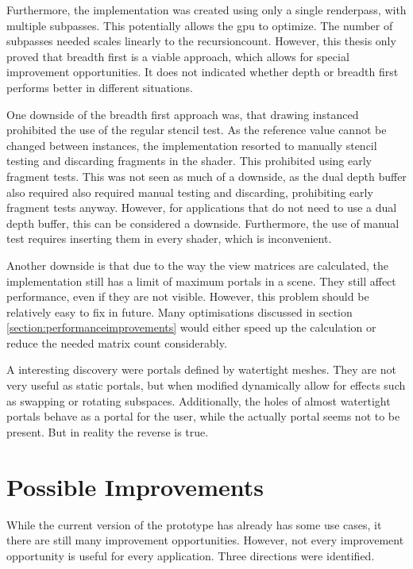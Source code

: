 Furthermore, the implementation was created using only a single renderpass, with multiple subpasses. This potentially allows the \gls{gpu} to optimize. The number of subpasses needed scales linearly to the \gls{recursioncount}. However, this thesis only proved that breadth first is a viable approach, which allows for special improvement opportunities. It does not indicated whether depth or breadth first performs better in different situations.

One downside of the breadth first approach was, that drawing instanced prohibited the use of the regular stencil test. As the reference value cannot be changed between instances, the implementation resorted to manually stencil testing and discarding fragments in the shader. This prohibited using early fragment tests. This was not seen as much of a downside, as the dual depth buffer also required also required manual testing and discarding, prohibiting early fragment tests anyway. However, for applications that do not need to use a dual depth buffer, this can be considered a downside. Furthermore, the use of manual test requires inserting them in every shader, which is inconvenient.

Another downside is that due to the way the view matrices are calculated, the implementation still has a limit of maximum portals in a scene. They still affect performance, even if they are not visible. However, this problem should be relatively easy to fix in future. Many optimisations discussed in section \ref{section:performanceimprovements} would either speed up the calculation or reduce the needed matrix count considerably.

A interesting discovery were portals defined by watertight meshes. They are not very useful as static portals, but when modified dynamically allow for effects such as swapping or rotating subspaces. Additionally, the holes of almost watertight portals behave as a portal for the user, while the actually portal seems not to be present. But in reality the reverse is true.


\section{Possible Improvements}

While the current version of the prototype has already has some use cases, it there are still many improvement opportunities. However, not every improvement opportunity is useful for every application. Three directions were identified.

